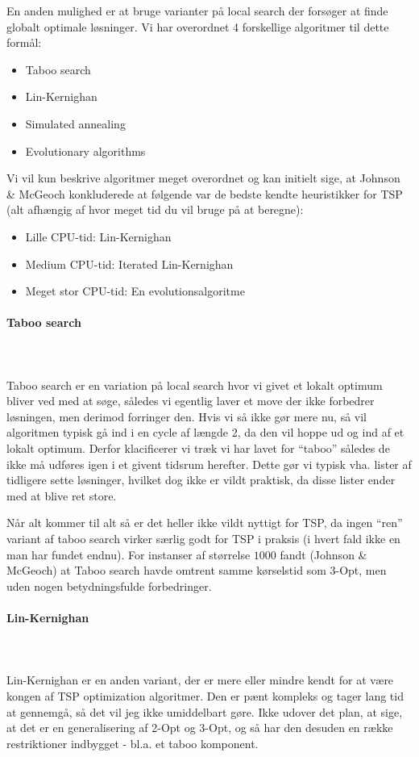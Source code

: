 En anden mulighed er at bruge varianter på local search der forsøger at finde globalt optimale løsninger. Vi har overordnet 4 forskellige algoritmer til dette formål:

\begin{itemize}
 \item Taboo search
 \item Lin-Kernighan
 \item Simulated annealing
 \item Evolutionary algorithms
\end{itemize}

Vi vil kun beskrive algoritmer meget overordnet og kan initielt sige, at Johnson \& McGeoch konkluderede at følgende var de bedste kendte heuristikker for TSP (alt afhængig af hvor meget tid du vil bruge på at beregne):
\begin{itemize}
 \item Lille CPU-tid: Lin-Kernighan
 \item Medium CPU-tid: Iterated Lin-Kernighan
 \item Meget stor CPU-tid: En evolutionsalgoritme
\end{itemize}


\paragraph{Taboo search}
~\\
~\\
Taboo search er en variation på local search hvor vi givet et lokalt optimum bliver ved med at søge, således vi egentlig laver et move der ikke forbedrer løsningen, men derimod forringer den. Hvis vi så ikke gør mere nu, så vil algoritmen typisk gå ind i en cycle af længde 2, da den vil hoppe ud og ind af et lokalt optimum. Derfor klacificerer vi træk vi har lavet for ``taboo'' således de ikke må udføres igen i et givent tidsrum herefter. Dette gør vi typisk vha. lister af tidligere sette løsninger, hvilket dog ikke er vildt praktisk, da disse lister ender med at blive ret store.

Når alt kommer til alt så er det heller ikke vildt nyttigt for TSP, da ingen ``ren'' variant af taboo search virker særlig godt for TSP i praksis (i hvert fald ikke en man har fundet endnu). For instanser af størrelse $1000$ fandt (Johnson \& McGeoch) at Taboo search havde omtrent samme kørselstid som 3-Opt, men uden nogen betydningsfulde forbedringer.


\paragraph{Lin-Kernighan}
~\\
~\\
Lin-Kernighan er en anden variant, der er mere eller mindre kendt for at være kongen af TSP optimization algoritmer. Den er pænt kompleks og tager lang tid at gennemgå, så det vil jeg ikke umiddelbart gøre. Ikke udover det plan, at sige, at det er en generalisering af 2-Opt og 3-Opt, og så har den desuden en række restriktioner indbygget - bl.a. et taboo komponent.

